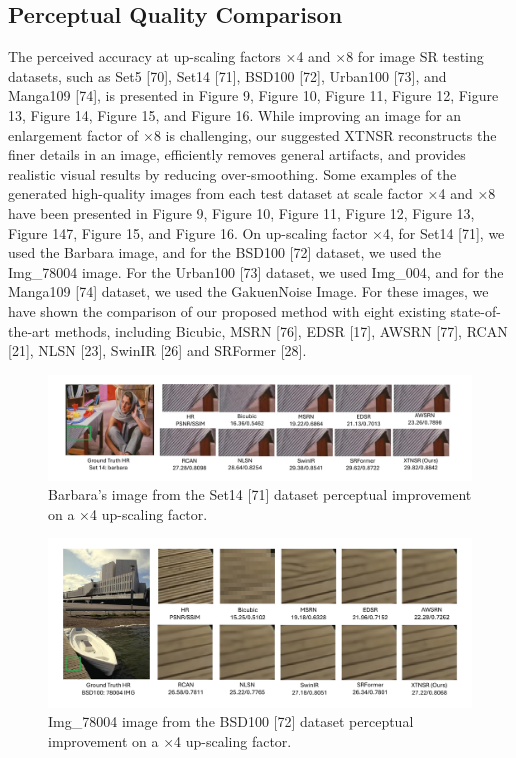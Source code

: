 \documentclass[twocolumn]{svjour3}          %
\begin{document}
\subsection{Perceptual Quality Comparison}
The perceived accuracy at up-scaling factors ×4 and ×8 for image SR testing datasets, such as Set5 [70], Set14 [71], BSD100 [72], Urban100 [73], and Manga109 [74], is presented in Figure 9, Figure 10, Figure 11, Figure 12, Figure 13, Figure 14, Figure 15, and Figure 16. While improving an image for an enlargement factor of ×8 is challenging, our suggested XTNSR reconstructs the finer details in an image, efficiently removes general artifacts, and provides realistic visual results by reducing over-smoothing. 
Some examples of the generated high-quality images from each test dataset at scale factor ×4 and ×8 have been presented in Figure 9, Figure 10, Figure 11, Figure 12, Figure 13, Figure 147, Figure 15, and Figure 16. On up-scaling factor ×4, for Set14 [71], we used the Barbara image, and for the BSD100 [72] dataset, we used the Img\_78004 image. For the Urban100 [73] dataset, we used Img\_004, and for the Manga109 [74] dataset, we used the GakuenNoise Image. For these images, we have shown the comparison of our proposed method with eight existing state-of-the-art methods, including Bicubic, MSRN [76], EDSR [17], AWSRN [77], RCAN [21], NLSN [23], SwinIR [26] and SRFormer [28].

\begin{figure}
  \centering
  \includegraphics[width=\linewidth]{9FIGURE.pdf}
   \caption {Barbara's image from the Set14 [71] dataset perceptual improvement on a ×4 up-scaling factor.}
    \label{fig:12}
\end{figure}

\begin{figure}
  \centering
  \includegraphics[width=\linewidth]{10FIGURE.pdf}
   \caption {Img\_78004 image from the BSD100 [72] dataset perceptual improvement on a ×4 up-scaling factor.}
    \label{fig:13}
\end{figure}
\end{document}

